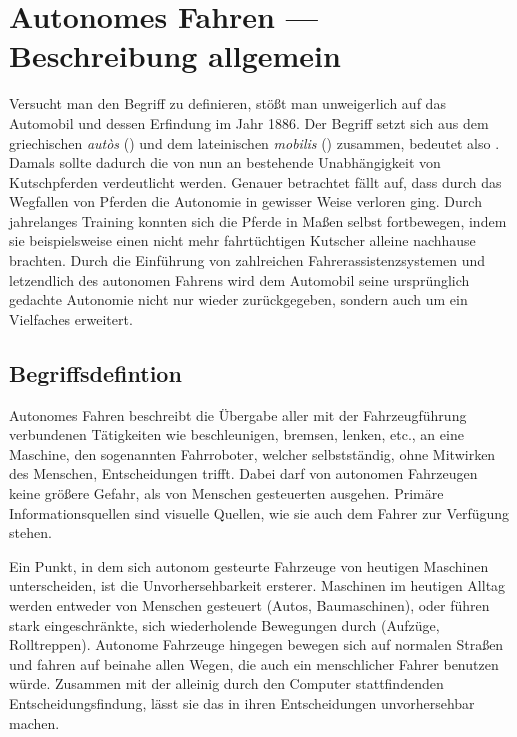 \chapter{Autonomes Fahren --- Beschreibung allgemein}

Versucht man den Begriff  zu definieren, stößt man unweigerlich auf das Automobil und dessen Erfindung im Jahr 1886. Der Begriff  setzt sich aus dem griechischen \textit{autòs} () und dem lateinischen \textit{mobilis} () zusammen, bedeutet also . Damals sollte dadurch die von nun an bestehende Unabhängigkeit von Kutschpferden verdeutlicht werden. Genauer betrachtet fällt auf, dass durch das Wegfallen von Pferden die Autonomie in gewisser Weise verloren ging. Durch jahrelanges Training konnten sich die Pferde in Maßen selbst fortbewegen, indem sie beispielsweise einen nicht mehr fahrtüchtigen Kutscher alleine nachhause brachten.
Durch die Einführung von zahlreichen Fahrerassistenzsystemen und letzendlich des autonomen Fahrens wird dem Automobil seine ursprünglich gedachte Autonomie nicht nur wieder zurückgegeben, sondern auch um ein Vielfaches erweitert.


\section{Begriffsdefintion}


Autonomes Fahren beschreibt die Übergabe aller mit der Fahrzeugführung verbundenen Tätigkeiten wie beschleunigen, bremsen, lenken, etc., an eine Maschine, den sogenannten Fahrroboter, welcher selbstständig, ohne Mitwirken des Menschen, Entscheidungen trifft. Dabei darf von autonomen Fahrzeugen keine größere Gefahr, als von Menschen gesteuerten ausgehen. Primäre Informationsquellen sind visuelle Quellen, wie sie auch dem Fahrer zur Verfügung stehen.

Ein Punkt, in dem sich autonom gesteurte Fahrzeuge von heutigen Maschinen unterscheiden, ist die Unvorhersehbarkeit ersterer. Maschinen im heutigen Alltag werden entweder von Menschen gesteuert (\zB Autos, Baumaschinen), oder führen stark eingeschränkte, sich wiederholende Bewegungen durch (\zB Aufzüge, Rolltreppen). Autonome Fahrzeuge hingegen bewegen sich auf normalen Straßen und fahren auf beinahe allen Wegen, die auch ein menschlicher Fahrer benutzen würde. Zusammen mit der alleinig durch den Computer stattfindenden Entscheidungsfindung, lässt sie das in ihren Entscheidungen unvorhersehbar machen.

